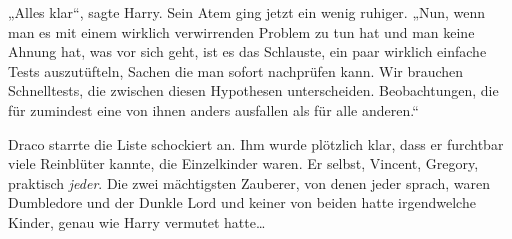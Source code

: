 „Alles klar“, sagte Harry. Sein Atem ging jetzt ein wenig ruhiger. „Nun, wenn man es mit einem wirklich verwirrenden Problem zu tun hat und man keine Ahnung hat, was vor sich geht, ist es das Schlauste, ein paar wirklich einfache Tests auszutüfteln, Sachen die man sofort nachprüfen kann. Wir brauchen Schnelltests, die zwischen diesen Hypothesen unterscheiden. Beobachtungen, die für zumindest eine von ihnen anders ausfallen als für alle anderen.“

Draco starrte die Liste schockiert an. Ihm wurde plötzlich klar, dass er furchtbar viele Reinblüter kannte, die Einzelkinder waren. Er selbst, Vincent, Gregory, praktisch \emph{jeder}. Die zwei mächtigsten Zauberer, von denen jeder sprach, waren Dumbledore und der Dunkle Lord und keiner von beiden hatte irgendwelche Kinder, genau wie Harry vermutet hatte…

